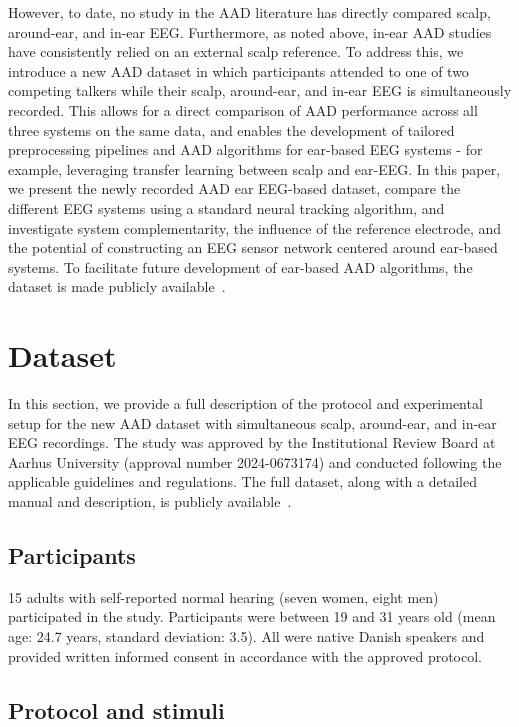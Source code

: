 \documentclass[fleqn,10pt]{wlscirep}
\begin{document}
	However, to date, no study in the AAD literature has directly compared scalp, around-ear, and in-ear EEG. Furthermore, as noted above, in-ear AAD studies have consistently relied on an external scalp reference. To address this, we introduce a new AAD dataset in which participants attended to one of two competing talkers while their scalp, around-ear, and in-ear EEG is simultaneously recorded. This allows for a direct comparison of AAD performance across all three systems on the same data, and enables the development of tailored preprocessing pipelines and AAD algorithms for ear-based EEG systems - for example, leveraging transfer learning between scalp and ear-EEG. In this paper, we present the newly recorded AAD ear EEG-based dataset, compare the different EEG systems using a standard neural tracking algorithm, and investigate system complementarity, the influence of the reference electrode, and the potential of constructing an EEG sensor network centered around ear-based systems. To facilitate future development of ear-based AAD algorithms, the dataset is made publicly available~\cite{geirnaert2025ear}.  
	
	\section*{Dataset}
	
	In this section, we provide a full description of the protocol and experimental setup for the new AAD dataset with simultaneous scalp, around-ear, and in-ear EEG recordings. The study was approved by the Institutional Review Board at Aarhus University (approval number 2024-0673174) and conducted following the applicable guidelines and regulations. The full dataset, along with a detailed manual and description, is publicly available~\cite{geirnaert2025ear}.
	
	\subsection*{Participants}
	15 adults with self-reported normal hearing (seven women, eight men) participated in the study. Participants were between 19 and 31 years old (mean age: 24.7 years, standard deviation: 3.5). All were native Danish speakers and provided written informed consent in accordance with the approved protocol.
	
	\subsection*{Protocol and stimuli}
	
\end{document}
